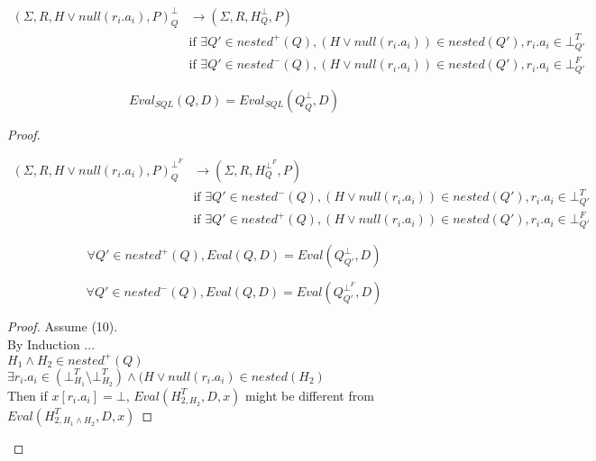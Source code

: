 \begin{mydef}
	\begin{align*}
		(\Sigma,R,H \lor null(r_i.a_i),P)^\bot_Q & \rightarrow (\Sigma,R,H^\bot_{Q},P) \\
		& \mbox{if } \exists Q' \in nested^+(Q), (H\lor null(r_i.a_i)) \in nested(Q'), r_i.a_i \in \bot^T_{Q'} \\
		& \mbox{if } \exists Q' \in nested^-(Q), (H\lor null(r_i.a_i)) \in nested(Q'), r_i.a_i \in \bot^F_{Q'}
	\end{align*}
\end{mydef}



\begin{myprop}
	$$Eval_{SQL}(Q,D) = Eval_{SQL}(Q^\bot_Q,D)$$
\end{myprop}

\begin{proof}
	
	\begin{mydef}
		\begin{align*}
			(\Sigma,R,H \lor null(r_i.a_i),P)^{\bot^F}_Q & \rightarrow (\Sigma,R,H^{\bot^F}_{Q},P) \\
			& \mbox{if } \exists Q' \in nested^-(Q), (H\lor null(r_i.a_i)) \in nested(Q'), r_i.a_i \in \bot^T_{Q'} \\
			& \mbox{if } \exists Q' \in nested^+(Q), (H\lor null(r_i.a_i)) \in nested(Q'), r_i.a_i \in \bot^F_{Q'}
		\end{align*}
	\end{mydef}
	
	\begin{myprop}
		$$\forall Q' \in nested^+(Q), Eval(Q,D) = Eval(Q^\bot_{Q'},D)$$
	\end{myprop}
	\begin{myprop}
		$$\forall Q' \in nested^-(Q), Eval(Q,D) = Eval(Q^{\bot^F}_{Q'},D)$$
	\end{myprop}
	
	\begin{proof}
		Assume (10).
		\\By Induction ...
		\\$H_1 \land H_2 \in nested^+(Q)$
		\\$\exists r_i.a_i \in (\bot^T_{H_1} \setminus \bot^T_{H_2}) \land (H\lor null(r_i.a_i)\in nested(H_2)$
		\\Then if $x[r_i.a_i] = \bot$, $Eval(H^T_{2,H_2},D,x)$ might be different from $Eval(H^T_{2,H_1\land H_2},D,x)$
	\end{proof}
	
	
\end{proof}